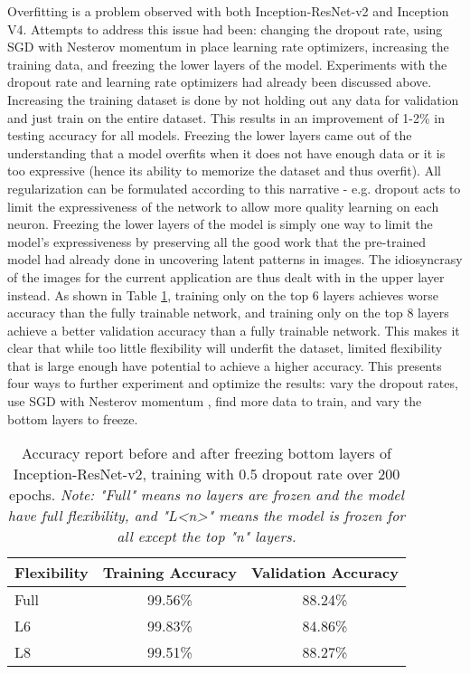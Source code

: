 \documentclass[a4paper]{article}
\begin{document}
Overfitting is a problem observed with both Inception-ResNet-v2 and Inception V4. Attempts to address this issue had been: changing the dropout rate, using SGD with Nesterov momentum in place learning rate optimizers, increasing the training data, and freezing the lower layers of the model. Experiments with the dropout rate and learning rate optimizers had already been discussed above. Increasing the training dataset is done by not holding out any data for validation and just train on the entire dataset. This results in an improvement of 1-2\% in testing accuracy for all models. Freezing the lower layers came out of the understanding that a model overfits when it does not have enough data or it is too expressive (hence its ability to memorize the dataset and thus overfit). All regularization can be formulated according to this narrative - e.g. dropout acts to limit the expressiveness of the network to allow more quality learning on each neuron. Freezing the lower layers of the model is simply one way to limit the model's expressiveness by preserving all the good work that the pre-trained model had already done in uncovering latent patterns in images. The idiosyncrasy of the images for the current application are thus dealt with in the upper layer instead. As shown in Table \ref{tab:freeze_layers}, training only on the top 6 layers achieves worse accuracy than the fully trainable network, and training only on the top 8 layers achieve a better validation accuracy than a fully trainable network. This makes it clear that while too little flexibility will underfit the dataset, limited flexibility that is large enough have potential to achieve a higher accuracy. This presents four ways to further experiment and optimize the results: vary the dropout rates, use SGD with Nesterov momentum \cite{Wilson2017}, find more data to train, and vary the bottom layers to freeze.

\begin{table}
\centering
\begin{tabular}{l|c|c}
Flexibility & Training Accuracy & Validation Accuracy \\\hline
Full & 99.56\% & 88.24\% \\
L6 & 99.83\% & 84.86\% \\
L8 & 99.51\% & 88.27\% \\
\end{tabular}
\caption{\label{tab:freeze_layers}Accuracy report before and after freezing bottom layers of Inception-ResNet-v2, training with 0.5 dropout rate over 200 epochs. \textit{Note: "Full" means no layers are frozen and the model have full flexibility, and "L<n>" means the model is frozen for all except the top "n" layers.}}
\end{table}
\end{document}
